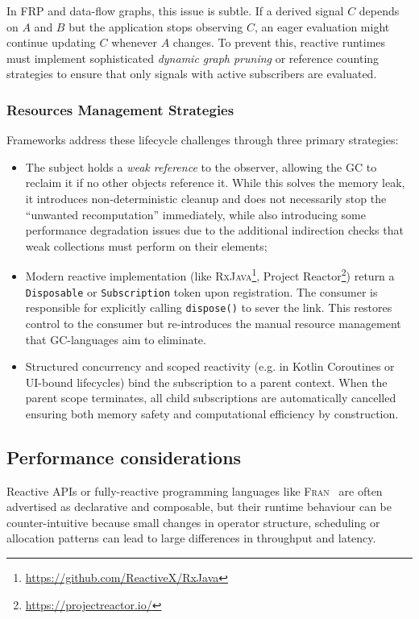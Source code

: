 In \ac{FRP} and data-flow graphs, this issue is subtle. If a derived signal $C$
depends on $A$ and $B$ but the application stops observing $C$, an eager
evaluation might continue updating $C$ whenever $A$ changes. To prevent this,
reactive runtimes must implement sophisticated \emph{dynamic graph pruning} or
reference counting strategies to ensure that only signals with active
subscribers are evaluated.

\subsubsection{Resources Management Strategies}
Frameworks address these lifecycle challenges through three primary strategies:
\begin{itemize}
	\item The subject holds a \emph{weak reference} to the observer, allowing
	      the \ac{GC} to reclaim it if no other objects reference it. While this
	      solves the memory leak, it introduces non-deterministic cleanup and
	      does not necessarily stop the ``unwanted recomputation'' immediately,
	      while also introducing some performance degradation issues due to the
	      additional indirection checks that weak collections must perform on
	      their elements;
	\item Modern reactive implementation (like
	      \textsc{RxJava}\footnote{\url{https://github.com/ReactiveX/RxJava}},
	      Project Reactor\footnote{\url{https://projectreactor.io/}}) return a
	      \texttt{Disposable} or \texttt{Subscription} token upon registration.
	      The consumer is responsible for explicitly calling \texttt{dispose()}
	      to sever the link. This restores control to the consumer but
	      re-introduces the manual resource management that \ac{GC}-languages aim
	      to eliminate.
	\item Structured concurrency and scoped reactivity (e.g. in Kotlin
	      Coroutines or UI-bound lifecycles) bind the subscription to a parent
	      context. When the parent scope terminates, all child subscriptions are
	      automatically cancelled ensuring both memory safety and computational
	      efficiency by construction.
\end{itemize}

\subsection{Performance considerations}\label{ssec:react_perf}
Reactive \ac{API}s or fully-reactive programming languages like
\textsc{Fran}~\cite{elliott1997FRA} are often advertised as declarative and
composable, but their runtime behaviour can be counter-intuitive because small
changes in operator structure, scheduling or allocation patterns can lead to
large differences in throughput and latency.

